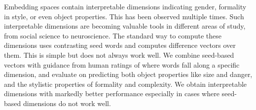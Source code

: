 Embedding spaces contain interpretable dimensions indicating gender, formality in style, or even object properties. This has been observed multiple times. Such interpretable dimensions are becoming valuable tools in different areas of study, from social science to neuroscience. The standard way to compute these dimensions uses contrasting seed words and computes  difference vectors over them. This is simple but does not always work well. We combine seed-based vectors with guidance from human ratings of where words fall along a specific dimension, and evaluate on predicting both object properties like size and danger, and the stylistic properties of formality and complexity. We obtain interpretable dimensions with markedly better performance especially in cases where seed-based dimensions do not work well.
